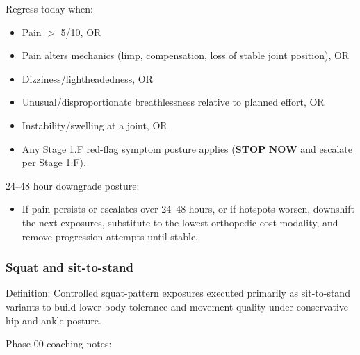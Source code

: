 \documentclass[10pt]{article}
\begin{document}
Regress today when:

\begin{itemize}
\item Pain $>$ 5/10, OR
\item Pain alters mechanics (limp, compensation, loss of stable joint position), OR
\item Dizziness/lightheadedness, OR
\item Unusual/disproportionate breathlessness relative to planned effort, OR
\item Instability/swelling at a joint, OR
\item Any Stage 1.F red-flag symptom posture applies (\textbf{STOP} \textbf{NOW} and escalate per Stage 1.F).
\end{itemize}

24–48 hour downgrade posture:

\begin{itemize}
\item If pain persists or escalates over 24–48 hours, or if hotspots worsen, downshift the next exposures, substitute to the lowest orthopedic cost modality, and remove progression attempts until stable.
\end{itemize}

\subsubsection*{Squat and sit-to-stand}

Definition: Controlled squat-pattern exposures executed primarily as sit-to-stand variants to build lower-body tolerance and movement quality under conservative hip and ankle posture.

Phase 00 coaching notes:
\end{document}
